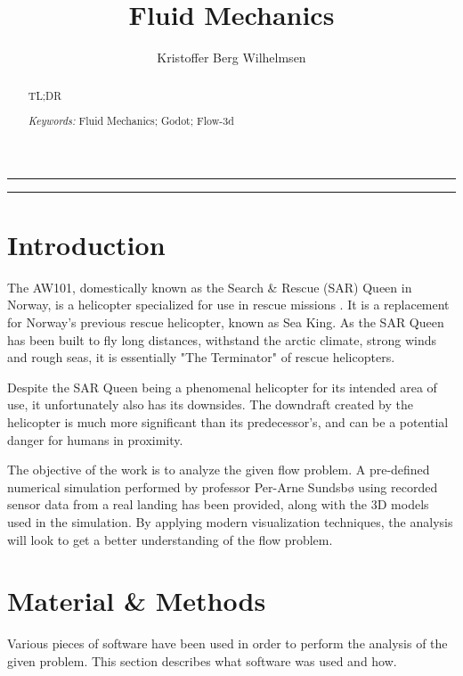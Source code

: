 \documentclass[a4paper,11pt]{extarticle}
\title{Fluid Mechanics}
\author{Kristoffer Berg Wilhelmsen}
\date{\parbox{\linewidth}{\centering
    \textit{\small UiT - The Arctic University of Norway, P.O. Box 385, N-8505 Narvik, Norway}\endgraf\bigskip
    \small Submitted \today
}}
\providecommand{\keywords}[1]{\flushleft\textit{\small{Keywords:}} #1}
\begin{document}
\maketitle

\noindent\rule{\linewidth}{.5pt}
\begin{abstract}
  TL;DR

  \keywords{\small{Fluid Mechanics}; \small{Godot}; \small{Flow-3d}}
\end{abstract}
\rule{\linewidth}{.5pt}


\section{Introduction}
The AW101, domestically known as the Search \& Rescue (SAR) Queen in Norway, is a helicopter specialized for use in rescue missions \citep{ProjectDescription}. It is a replacement for Norway's previous rescue helicopter, known as Sea King. As the SAR Queen has been built to fly long distances, withstand the arctic climate, strong winds and rough seas, it is essentially "The Terminator" of rescue helicopters.

Despite the SAR Queen being a phenomenal helicopter for its intended area of use, it unfortunately also has its downsides. The downdraft created by the helicopter is much more significant than its predecessor's, and can be a potential danger for humans in proximity.

The objective of the work is to analyze the given flow problem. A pre-defined numerical simulation performed by professor Per-Arne Sundsbø using recorded sensor data from a real landing has been provided, along with the 3D models used in the simulation. By applying modern visualization techniques, the analysis will look to get a better understanding of the flow problem.



\section{Material \& Methods}
Various pieces of software have been used in order to perform the analysis of the given problem. This section describes what software was used and how.
\end{document}
